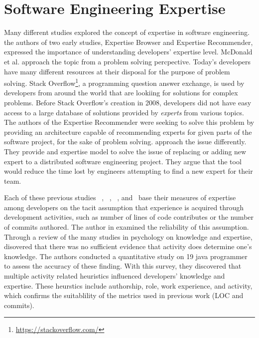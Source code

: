 \section{Software Engineering Expertise}
\label{sec:expertise_models}

Many different studies explored the concept of expertise in software engineering. the authors of two early studies, Expertise Browser \citep{mockus02} and Expertise Recommender\citep{McDonald}, expressed the importance of understanding developers' expertise level. McDonald et al. approach the topic from a problem solving percpective. Today's developers have many different resources at their disposal for the purpose of problem solving. Stack Overflow\footnote{\url{https://stackoverflow.com/}}, a programming question answer exchange, is used by developers from around the world that are lookiing for solutions for complex problems. Before Stack Overflow's creation in 2008, developers did not have easy access to a large database of solutions provided by \textit{experts} from various topics. The authors of the Expertise Recommender were seeking to solve this problem by providing an architecture capable of recommending experts for given parts of the software project, for the sake of problem solving. \citep{mockus02} approach the issue differently. They provide and expertise model to solve the issue of replacing or adding new expert to a distributed software engineering project. They argue that the tool would reduce the time lost by engineers attempting to find a new expert for their team.  


Each of these previous studies ~\citep{Bhattacharya}, ~\citep{mockus02}, ~\citep{McDonald}, and~\citep{Fritz-2007} base their measures of expertise among developers on the tacit assumption that experience is acquired through development activities, such as number of lines of code contributes or the number of commits authored. The author in \citep{Fritz-2007} examined the reliability of this assumption. Through a review of the many studies in psychology on knowledge and expertise, \citep{Fritz-2007} disovered that there was no sufficient evidence that activity does determine one's knowledge. The authors conducted a quantitative study on 19 java programmer to assess the accuracy of these finding. With this survey, they discovered that multiple activity related heuristics influenced developers' knowledge and expertise. These heurstics include authorship, role, work experience, and activity, which confirms the suitablility of the metrics used in previous work (LOC and commits).

